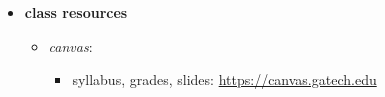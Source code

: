 \begin{frame}
\begin{itemize}
                \smallskip
                \item<3-> \textbf{class resources}
                    \begin{itemize}
                        \item	\textit{canvas}:
                            \begin{itemize}
                                \item   syllabus, grades, slides: \url{https://canvas.gatech.edu}
                            \end{itemize}
                    \end{itemize}
            \end{itemize}
            
        \end{frame}

